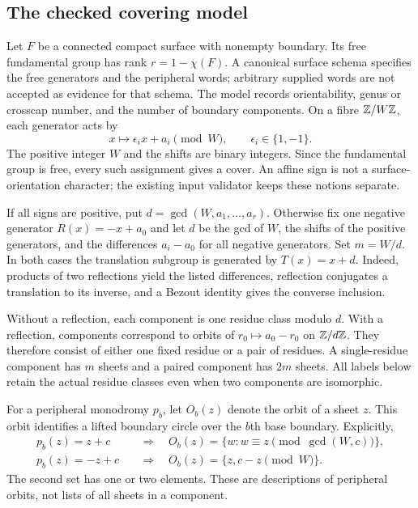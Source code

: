 \subsection{The checked covering model}

Let $F$ be a connected compact surface with nonempty boundary.  Its free
fundamental group has rank $r=1-\chi(F)$.  A canonical surface schema
specifies the free generators and the peripheral words; arbitrary supplied
words are not accepted as evidence for that schema.  The model records
orientability, genus or crosscap number, and the number of boundary
components.  On a fibre $\mathbb Z/W\mathbb Z$, each generator acts by
\[
 x\longmapsto \epsilon_i x+a_i\pmod W,
 \qquad \epsilon_i\in\{1,-1\}.
\]
The positive integer $W$ and the shifts are binary integers.  Since the
fundamental group is free, every such assignment gives a cover.  An affine
sign is not a surface-orientation character; the existing input validator
keeps these notions separate.

If all signs are positive, put $d=\gcd(W,a_1,\ldots,a_r)$.  Otherwise fix
one negative generator $R(x)=-x+a_0$ and let $d$ be the gcd of $W$, the
shifts of the positive generators, and the differences $a_i-a_0$ for all
negative generators.  Set $m=W/d$.  In both cases the translation subgroup
is generated by $T(x)=x+d$.  Indeed, products of two reflections yield the
listed differences, reflection conjugates a translation to its inverse,
and a Bezout identity gives the converse inclusion.

Without a reflection, each component is one residue class modulo $d$.
With a reflection, components correspond to orbits of
$r_0\mapsto a_0-r_0$ on $\mathbb Z/d\mathbb Z$.  They therefore consist of either one
fixed residue or a pair of residues.  A single-residue component has $m$
sheets and a paired component has $2m$ sheets.  All labels below retain
the actual residue classes even when two components are isomorphic.

For a peripheral monodromy $p_b$, let $O_b(z)$ denote the orbit of a sheet
$z$.  This orbit identifies a lifted boundary circle over the $b$th base
boundary.  Explicitly,
\begin{align}
 p_b(z)=z+c &\quad\Longrightarrow\quad
 O_b(z)=\{w:w\equiv z\pmod{\gcd(W,c)}\},\label{eq:bt-translation-orbit}\\
 p_b(z)=-z+c &\quad\Longrightarrow\quad
 O_b(z)=\{z,c-z\pmod W\}.\label{eq:bt-reflection-orbit}
\end{align}
The second set has one or two elements.  These are descriptions of
peripheral orbits, not lists of all sheets in a component.

